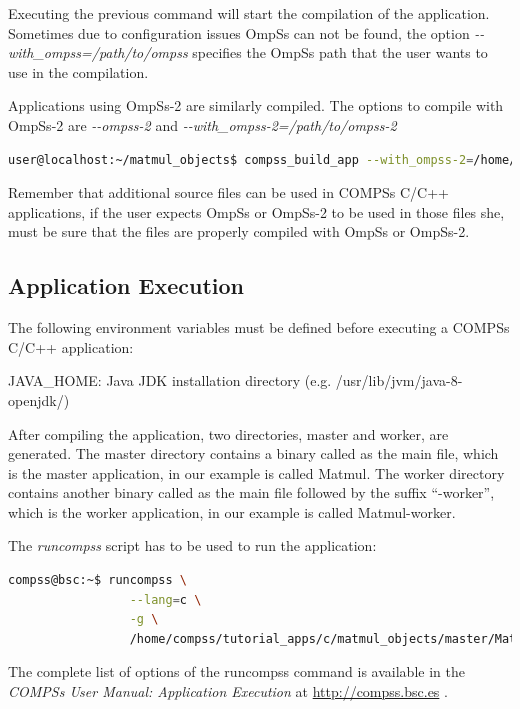 Executing the previous command will start the compilation of the application. Sometimes due to configuration issues OmpSs can not be found, the option \textit{-{}-with\_ompss=/path/to/ompss} specifies the OmpSs path that the user wants to use in the compilation.

\par\bigskip

Applications using OmpSs-2 are similarly compiled. The options to compile with OmpSs-2 are \textit{-{}-ompss-2} and \textit{-{}-with\_ompss-2=/path/to/ompss-2}

\begin{lstlisting}[language=bash]
user@localhost:~/matmul_objects$ compss_build_app --with_ompss-2=/home/mdomingu/ompss-2 --ompss-2 Matmul
\end{lstlisting}

Remember that additional source files can be used in COMPSs C/C++ applications, if the user expects OmpSs or OmpSs-2 to be used in those files she, must be sure that the files are properly compiled with OmpSs or OmpSs-2.

\subsection{Application Execution}

The following environment variables must be defined before executing a COMPSs C/C++ application:
            
JAVA\_HOME: Java JDK installation directory (e.g. /usr/lib/jvm/java-8-openjdk/)

After compiling the application, two directories, master and worker, are generated. 
The master directory contains a binary called as the main file, which is the master application, in our 
example is called Matmul. The worker directory contains another binary called as the main file followed 
by the suffix ``-worker'', which is the worker application, in our example is called Matmul-worker.

The \textit{runcompss} script has to be used to run the application:

\begin{lstlisting}[language=bash]
compss@bsc:~$ runcompss \
                 --lang=c \
                 -g \
                 /home/compss/tutorial_apps/c/matmul_objects/master/Matmul 3 4 2.0
\end{lstlisting}

The complete list of options of the runcompss command is available in the \textit{COMPSs User Manual: Application
Execution} at \url{http://compss.bsc.es} . 

